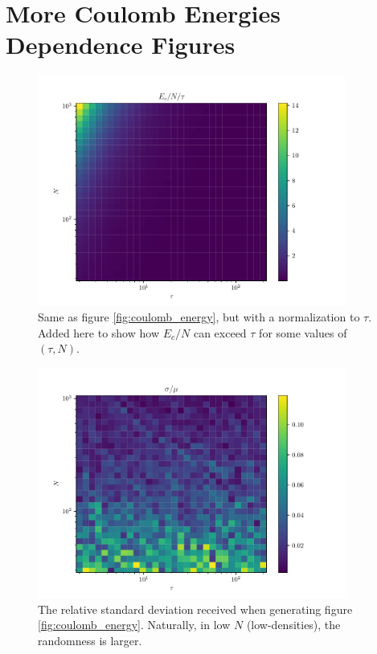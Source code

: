 \chapter{More Coulomb Energies Dependence Figures}

\begin{figure}[h]
	\begin{center}
		\includegraphics[width=0.9\textwidth]{graphics/coulomb_energy_example@relative_coulomb_energy.pdf}
	\end{center}
	\caption{Same as figure \ref{fig:coulomb_energy}, but with a normalization to $\tau$. Added here to show how $E_c/N$ can exceed $\tau$ for some values of $(\tau,N)$.}
	\label{fig:coulomb_energy_normalized}
\end{figure}

\begin{figure}
	\begin{center}
		\includegraphics[width=0.9\textwidth]{graphics/coulomb_energy_example@relative_std.pdf}
	\end{center}
	\caption{The relative standard deviation received when generating figure \ref{fig:coulomb_energy}. Naturally, in low $N$ (low-densities), the randomness is larger.}
	\label{fig:coulomb_energy_std}
\end{figure}

